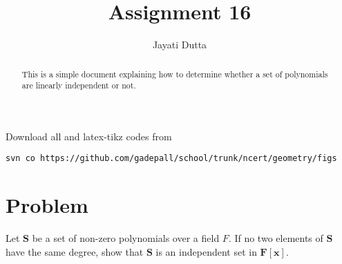 \documentclass[journal,12pt,twocolumn]{IEEEtran}
\begin{document}
\let\StandardTheFigure\thefigure
\let\vec\mathbf
\renewcommand{\thefigure}{\theproblem}



\def\putbox#1#2#3{\makebox[0in][l]{\makebox[#1][l]{}\raisebox{\baselineskip}[0in][0in]{\raisebox{#2}[0in][0in]{#3}}}}
     \def\rightbox#1{\makebox[0in][r]{#1}}
     \def\centbox#1{\makebox[0in]{#1}}
     \def\topbox#1{\raisebox{-\baselineskip}[0in][0in]{#1}}
     \def\midbox#1{\raisebox{-0.5\baselineskip}[0in][0in]{#1}}

\vspace{3cm}


\title{Assignment 16}
\author{Jayati Dutta}





\maketitle

\newpage


\bigskip

\renewcommand{\thefigure}{\theenumi}
\renewcommand{\thetable}{\theenumi}


\begin{abstract}
This is a simple document explaining how to determine whether a set of polynomials are linearly independent or not.
\end{abstract}

%

Download all and latex-tikz codes from 
%
\begin{lstlisting}
svn co https://github.com/gadepall/school/trunk/ncert/geometry/figs
\end{lstlisting}
%


\section{Problem}
Let $\vec{S}$ be a set of non-zero polynomials over a field $F$. If no two elements of $\vec{S}$ have the same degree, show that $\vec{S}$ is an independent set in $\vec{F[x]}$.
\end{document}
